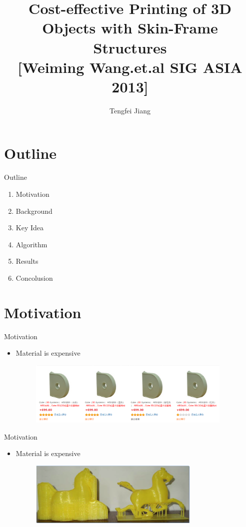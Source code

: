 \documentclass{beamer}
\begin{document}
\title{Cost-effective Printing of 3D Objects with Skin-Frame Structures\\
\small{[Weiming Wang.et.al SIG ASIA 2013]}}
\author{Tengfei Jiang}

\newcommand{\FPP}[2]{\frac{\partial #1}{\partial #2}}
\begin{frame}
  \titlepage
\end{frame}

\section{Outline}
\begin{frame}{Outline}
  \begin{enumerate}
    \item Motivation
    \item Background
    \item Key Idea
    \item Algorithm
    \item Results
    \item Concolusion
  \end{enumerate}
\end{frame}


\section{Motivation}
\begin{frame}{Motivation}
\begin{itemize}
\item Material is expensive
\begin{figure}
\centering
\includegraphics[height=1.2in]{./img/cost.png}
\end{figure}
\end{itemize}
\end{frame}

\begin{frame}{Motivation}
\begin{itemize}
\item Material is expensive
\begin{figure}
\centering
\includegraphics[height=1.2in]{./img/comparison.png}
\end{figure}
\end{itemize}
\end{frame}
\end{document}
